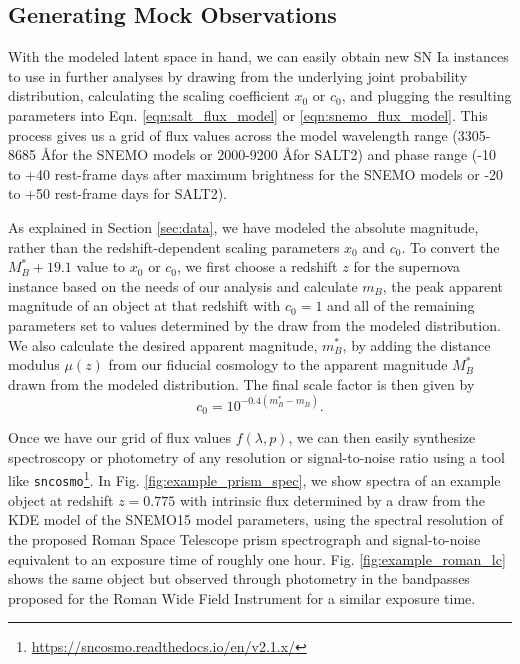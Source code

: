 \subsection{Generating Mock Observations}
With the modeled latent space in hand, we can easily obtain new SN Ia instances to use in further analyses by drawing from the underlying joint probability distribution, calculating the scaling coefficient $x_0$ or $c_0$, and plugging the resulting parameters into Eqn. \ref{eqn:salt_flux_model} or \ref{eqn:snemo_flux_model}. This process gives us a grid of flux values across the model wavelength range (3305-8685 \AA for the SNEMO models or 2000-9200 \AA for SALT2) and phase range (-10 to +40 rest-frame days after maximum brightness for the SNEMO models or -20 to +50 rest-frame days for SALT2).

As explained in Section \ref{sec:data}, we have modeled the absolute magnitude, rather than the redshift-dependent scaling parameters $x_0$ and $c_0$. To convert the $M_B^* + 19.1$ value to $x_0$ or $c_0$, we first choose a redshift $z$ for the supernova instance based on the needs of our analysis and calculate $m_B$, the peak apparent magnitude of an object at that redshift with $c_0=1$ and all of the remaining parameters set to values determined by the draw from the modeled distribution. We also calculate the desired apparent magnitude, $m_B^*$, by adding the distance modulus $\mu(z)$ from our fiducial cosmology to the apparent magnitude $M_B^*$ drawn from the modeled distribution. The final scale factor is then given by 
$$c_0 = 10^{-0.4(m_B^*-m_B)}.$$

Once we have our grid of flux values $f(\lambda, p)$, we can then easily synthesize spectroscopy or photometry of any resolution or signal-to-noise ratio using a tool like \verb|sncosmo|\footnote{\url{https://sncosmo.readthedocs.io/en/v2.1.x/}}. In Fig. \ref{fig:example_prism_spec}, we show spectra of an example object at redshift $z=0.775$ with intrinsic flux determined by a draw from the KDE model of the SNEMO15 model parameters, using the spectral resolution of the proposed Roman Space Telescope prism spectrograph and signal-to-noise equivalent to an exposure time of roughly one hour. Fig. \ref{fig:example_roman_lc} shows the same object but observed through photometry in the bandpasses proposed for the Roman Wide Field Instrument for a similar exposure time. 

